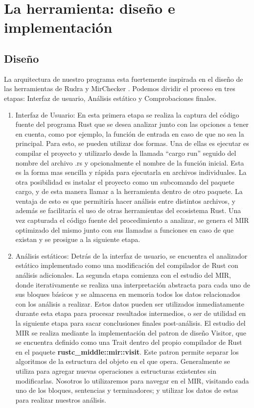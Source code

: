 \chapter{La herramienta: diseño e implementación}

\section{Diseño}

La arquitectura de nuestro programa esta fuertemente inspirada en el diseño de las herramientas de Rudra \cite{rudra} y MirChecker \cite{li2021mirchecker}. Podemos dividir el proceso en tres etapas: Interfaz de usuario, Análisis estático y Comprobaciones finales.

\begin{enumerate}
    \item Interfaz de Usuario: En esta primera etapa se realiza la captura del código fuente del programa Rust que se desea analizar junto con las opciones a tener en cuenta, como por ejemplo, la función de entrada en caso de que no sea la principal. Para esto, se pueden utilizar dos formas. Una de ellas es ejecutar es compilar el proyecto y utilizarlo desde la llamada ``cargo run'' seguido del nombre del archivo .rs y opcionalmente el nombre de la función inicial. Esta es la forma mas sencilla y rápida para ejecutarla en archivos individuales. La otra posibilidad es instalar el proyecto como un subcomando del paquete cargo, y de esta manera llamar a la herramienta dentro de otro paquete. La ventaja de esto es que permitiría hacer análisis entre distintos archivos, y además se facilitaría el uso de otras herramientas del ecosistema Rust. Una vez capturada el código fuente del procedimiento a analizar, se genera el MIR optimizado del mismo junto con sus llamadas a funciones en caso de que existan y se prosigue a la siguiente etapa.
    \item Análisis estáticos: Detrás de la interfaz de usuario, se encuentra el analizador estático implementado como una modificación del compilador de Rust con análisis adicionales. La segunda etapa comienza con el estudio del MIR, donde iterativamente se realiza una interpretación abstracta para cada uno de sus bloques básicos y se almacena en memoria todos los datos relacionados con los análisis a realizar. Estos datos pueden ser utilizados inmediatamente durante esta etapa para procesar resultados intermedios, o ser de utilidad en la siguiente etapa para sacar conclusiones finales post-análisis.
    El estudio del MIR se realiza mediante la implementación del patron de diseño Visitor, que se encuentra definido como una Trait dentro del propio compilador de Rust en el paquete \textbf{rustc\_middle::mir::visit}. Este patron permite separar los algoritmos de la estructura del objeto en el que opera. Generalmente se utiliza para agregar nuevas operaciones a estructuras existentes sin modificarlas. Nosotros lo utilizaremos para navegar en el MIR, visitando cada uno de los bloques, sentencias y terminadores; y utilizar los datos de estas para realizar nuestros análisis.

\end{enumerate}
